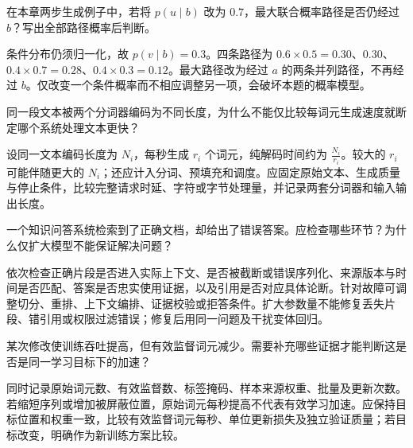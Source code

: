 
\begin{exercises}
\begin{exercise} 在本章两步生成例子中，若将 $p(u\mid b)$ 改为 $0.7$，最大联合概率路径是否仍经过 $b$？写出全部路径概率后判断。

\begin{solution}
条件分布仍须归一化，故 $p(v\mid b)=0.3$。四条路径为 $0.6\times0.5=0.30$、$0.30$、$0.4\times0.7=0.28$、$0.4\times0.3=0.12$。最大路径改为经过 $a$ 的两条并列路径，不再经过 $b$。仅改变一个条件概率而不相应调整另一项，会破坏本题的概率模型。
\end{solution}
\end{exercise}

\begin{exercise} 同一段文本被两个分词器编码为不同长度，为什么不能仅比较每词元生成速度就断定哪个系统处理文本更快？

\begin{solution}
设同一文本编码长度为 $N_i$，每秒生成 $r_i$ 个词元，纯解码时间约为 $\frac{N_i}{r_i}$。较大的 $r_i$ 可能伴随更大的 $N_i$；还应计入分词、预填充和调度。应固定原始文本、生成质量与停止条件，比较完整请求时延、字符或字节处理量，并记录两套分词器和输入输出长度。
\end{solution}
\end{exercise}

\begin{exercise} 一个知识问答系统检索到了正确文档，却给出了错误答案。应检查哪些环节？为什么仅扩大模型不能保证解决问题？

\begin{solution}
依次检查正确片段是否进入实际上下文、是否被截断或错误序列化、来源版本与时间是否匹配、答案是否忠实使用证据，以及引用是否对应具体论断。针对故障可调整切分、重排、上下文编排、证据校验或拒答条件。扩大参数量不能修复丢失片段、错引用或权限过滤错误；修复后用同一问题及干扰变体回归。
\end{solution}
\end{exercise}

\begin{exercise} 某次修改使训练吞吐提高，但有效监督词元减少。需要补充哪些证据才能判断这是否是同一学习目标下的加速？

\begin{solution}
同时记录原始词元数、有效监督数、标签掩码、样本来源权重、批量及更新次数。若缩短序列或增加被屏蔽位置，原始词元每秒提高不代表有效学习加速。应保持目标位置和权重一致，比较有效监督词元每秒、单位更新损失及独立验证质量；若目标改变，明确作为新训练方案比较。
\end{solution}
\end{exercise}

\end{exercises}

